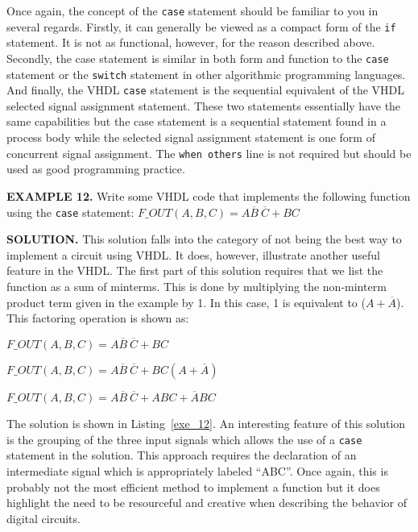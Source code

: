 Once again, the concept of the \texttt{case} statement should be familiar to you in several regards. Firstly, it can generally be viewed as a compact form of the \texttt{if} statement. It is not as functional, however, for the reason described above. Secondly, the case statement is similar in both form and function to the \texttt{case} statement or the \texttt{switch} statement in other algorithmic programming languages. And finally, the VHDL \texttt{case} statement is the sequential equivalent of the VHDL selected signal assignment statement. These two statements essentially have the same capabilities but the case statement is a sequential statement found in a process body while the selected signal assignment statement is one form of concurrent signal assignment. The  \texttt{when others} line is not required but should be used as good programming practice.

\begin{leftbar}
\noindent
\textbf{EXAMPLE 12.}
Write some VHDL code that implements the following function using the \texttt{case} statement:
$F\_OUT(A,B,C)=A\overline{B}~\!\overline{C}+BC$
\end{leftbar}
\noindent
\textbf{SOLUTION.} This solution falls into the category of not being the best way to implement a circuit using VHDL. It does, however, illustrate another useful feature in the VHDL. The first part of this solution requires that we list the function as a sum of minterms. This is done by multiplying the non-minterm product term given in the example by 1. In this case, 1 is equivalent to ($A+\overline{A}$). This factoring operation is shown as:

$F\_OUT(A,B,C)=A\overline{B}~\!\overline{C}+BC$

$F\_OUT(A,B,C)=A\overline{B}~\!\overline{C}+BC (A+\overline{A})$

$F\_OUT(A,B,C)=A\overline{B}~\!\overline{C}+ABC+\overline{A}BC$

The solution is shown in Listing~\ref{exe_12}. An interesting feature of this solution is the grouping of the three input signals which allows the use of a \texttt{case} statement in the solution. This approach requires the declaration of an intermediate signal which is appropriately labeled ``ABC''. Once again, this is probably not the most efficient method to implement a function but it does highlight the need to be resourceful and creative when describing the behavior of digital circuits.

